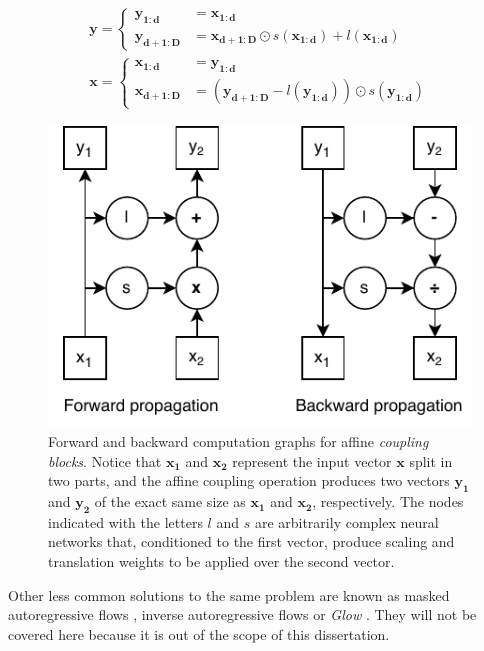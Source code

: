\begin{equation}
\label{eq:affinecouplingblock}
\begin{gathered}
	 \mathbf{y} = \begin{cases} \mathbf{y_{1: d}} & = \mathbf{x_{1: d}} \\
	\mathbf{y_{d+1: D}} & =\mathbf{x_{d+1: D}} \odot s\left(\mathbf{x_{1: d}}\right)+l\left(\mathbf{x_{1: d}}\right)\end{cases} \\
	\mathbf{x} = \begin{cases}
	\mathbf{x_{1: d}} &=\mathbf{y_{1: d}} \\
	\mathbf{x_{d+1: D}} &=\left(\mathbf{y_{d+1: D}}-l\left(\mathbf{y_{1: d}}\right)\right) \odot s\left(\mathbf{y_{1: d}}\right)
	\end{cases}
\end{gathered}
\end{equation}

\begin{figure}
	\centering
	\includegraphics[width=0.7\linewidth]{chapter2/images/affinecouplingblock}
	\caption{Forward and backward computation graphs for affine \textit{coupling blocks}. Notice that $\mathbf{x_1}$ and $\mathbf{x_2}$ represent the input vector $\mathbf{x}$ split in two parts, and the affine coupling operation produces two vectors $\mathbf{y_1}$ and $\mathbf{y_2}$ of the exact same size as $\mathbf{x_1}$ and $\mathbf{x_2}$, respectively. The nodes indicated with the letters $l$ and $s$ are arbitrarily complex neural networks that, conditioned to the first vector, produce scaling and translation weights to be applied over the second vector.}
	\label{fig:affinecouplingblock}
\end{figure}


Other less common solutions to the same problem are known as masked autoregressive flows \autocite{papamakarios2017}, inverse autoregressive flows \autocite{kingma2016} or \textit{Glow} \autocite{kingma2018}. They will not be covered here because it is out of the scope of this dissertation.

